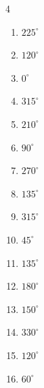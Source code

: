 \begin{multicols}{4}
\begin{enumerate}
  \item $\displaystyle 225^{\circ}$

  \item $\displaystyle 120^{\circ}$

  \item $\displaystyle 0^{\circ}$
        \phantom{$\displaystyle =0$}

  \item $\displaystyle 315^{\circ}$

  \item $\displaystyle 210^{\circ}$

  \item $\displaystyle 90^{\circ}$

  \item $\displaystyle 270^{\circ}$

  \item $\displaystyle 135^{\circ}$

  \item $\displaystyle 315^{\circ}$

  \item $\displaystyle 45^{\circ}$

  \item $\displaystyle 135^{\circ}$

  \item $\displaystyle 180^{\circ}$
        \phantom{$\displaystyle =\pi$}

  \item $\displaystyle 150^{\circ}$

  \item $\displaystyle 330^{\circ}$

  \item $\displaystyle 120^{\circ}$

  \item $\displaystyle 60^{\circ}$


\end{enumerate}
\end{multicols}
